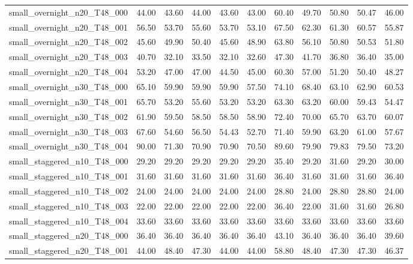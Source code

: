 \begin{table}[htbp]
\begin{tabular}{lrrrrrrrrrr}
small\_overnight\_n20\_T48\_000 & 44.00 & 43.60 & 44.00 & 43.60 & 43.00 & 60.40 & 49.70 & 50.80 & 50.47 & 46.00 \\
small\_overnight\_n20\_T48\_001 & 56.50 & 53.70 & 55.60 & 53.70 & 53.10 & 67.50 & 62.30 & 61.30 & 60.57 & 55.87 \\
small\_overnight\_n20\_T48\_002 & 45.60 & 49.90 & 50.40 & 45.60 & 48.90 & 63.80 & 56.10 & 50.80 & 50.53 & 51.80 \\
small\_overnight\_n20\_T48\_003 & 40.70 & 32.10 & 33.50 & 32.10 & 32.60 & 47.30 & 41.70 & 36.80 & 36.40 & 35.00 \\
small\_overnight\_n20\_T48\_004 & 53.20 & 47.00 & 47.00 & 44.50 & 45.00 & 60.30 & 57.00 & 51.20 & 50.40 & 48.27 \\
small\_overnight\_n30\_T48\_000 & 65.10 & 59.90 & 59.90 & 59.90 & 57.50 & 74.10 & 68.40 & 63.10 & 62.90 & 60.53 \\
small\_overnight\_n30\_T48\_001 & 65.70 & 53.20 & 55.60 & 53.20 & 53.20 & 63.30 & 63.20 & 60.00 & 59.43 & 54.47 \\
small\_overnight\_n30\_T48\_002 & 61.90 & 59.50 & 58.50 & 58.50 & 58.90 & 72.40 & 70.00 & 65.70 & 63.70 & 60.07 \\
small\_overnight\_n30\_T48\_003 & 67.60 & 54.60 & 56.50 & 54.43 & 52.70 & 71.40 & 59.90 & 63.20 & 61.00 & 57.67 \\
small\_overnight\_n30\_T48\_004 & 90.00 & 71.30 & 70.90 & 70.90 & 70.50 & 89.60 & 79.90 & 79.83 & 79.50 & 73.20 \\
small\_staggered\_n10\_T48\_000 & 29.20 & 29.20 & 29.20 & 29.20 & 29.20 & 35.40 & 29.20 & 31.60 & 29.20 & 30.00 \\
small\_staggered\_n10\_T48\_001 & 31.60 & 31.60 & 31.60 & 31.60 & 31.60 & 36.40 & 31.60 & 31.60 & 31.60 & 36.40 \\
small\_staggered\_n10\_T48\_002 & 24.00 & 24.00 & 24.00 & 24.00 & 24.00 & 28.80 & 24.00 & 28.80 & 28.80 & 24.00 \\
small\_staggered\_n10\_T48\_003 & 22.00 & 22.00 & 22.00 & 22.00 & 22.00 & 36.40 & 22.00 & 31.60 & 31.60 & 26.80 \\
small\_staggered\_n10\_T48\_004 & 33.60 & 33.60 & 33.60 & 33.60 & 33.60 & 33.60 & 33.60 & 33.60 & 33.60 & 33.60 \\
small\_staggered\_n20\_T48\_000 & 36.40 & 36.40 & 36.40 & 36.40 & 36.40 & 43.10 & 36.40 & 36.40 & 36.40 & 39.60 \\
small\_staggered\_n20\_T48\_001 & 44.00 & 48.40 & 47.30 & 44.00 & 44.00 & 58.80 & 48.40 & 47.30 & 47.30 & 46.37 \\

\end{tabular}
\end{table}
